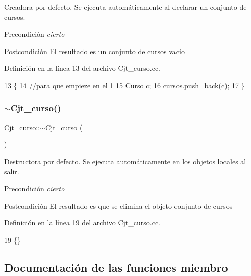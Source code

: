 Creadora por defecto. Se ejecuta automáticamente al declarar un conjunto de cursos. 

\begin{DoxyPrecond}{Precondición}
{\itshape cierto} 
\end{DoxyPrecond}
\begin{DoxyPostcond}{Postcondición}
El resultado es un conjunto de cursos vacio 
\end{DoxyPostcond}


Definición en la línea 13 del archivo Cjt\+\_\+curso.\+cc.


\begin{DoxyCode}
13                      \{
14   \textcolor{comment}{//para que empieze en el 1}
15   \mbox{\hyperlink{class_curso}{Curso}} c;
16   \mbox{\hyperlink{class_cjt__curso_af8d4def315cf56b9aab3328bf80bb32c}{cursos}}.push\_back(c);
17 \}
\end{DoxyCode}
\mbox{\label{class_cjt__curso_a8e50124d09c12ae21fe3afeb916313f4}} 
\subsubsection{\texorpdfstring{$\sim$\+Cjt\+\_\+curso()}{~Cjt\_curso()}}
{\footnotesize\ttfamily Cjt\+\_\+curso\+::$\sim$\+Cjt\+\_\+curso (\begin{DoxyParamCaption}{ }\end{DoxyParamCaption})}



Destructora por defecto. Se ejecuta automáticamente en los objetos locales al salir. 

\begin{DoxyPrecond}{Precondición}
{\itshape cierto} 
\end{DoxyPrecond}
\begin{DoxyPostcond}{Postcondición}
El resultado es que se elimina el objeto conjunto de cursos 
\end{DoxyPostcond}


Definición en la línea 19 del archivo Cjt\+\_\+curso.\+cc.


\begin{DoxyCode}
19 \{\}
\end{DoxyCode}


\subsection{Documentación de las funciones miembro}
\mbox{\label{class_cjt__curso_ae5cf07c6e8883a244c7557e446490254}} 
